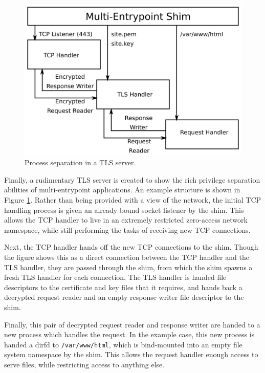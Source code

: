 \documentclass[sigplan]{acmart}
\begin{document}
\begin{figure}
    \centering
    \includegraphics[width=\columnwidth]{figures/tls-server-splitting.png}
    \caption{Process separation in a TLS server.}
    \label{fig:tls-server-splitting}
\end{figure}

Finally, a rudimentary TLS server is created to show the rich privilege separation abilities of multi-entrypoint applications. An example structure is shown in Figure \ref{fig:tls-server-splitting}. Rather than being provided with a view of the network, the initial TCP handling process is given an already bound socket listener by the shim. This allows the TCP handler to live in an extremely restricted zero-access network namespace, while still performing the tasks of receiving new TCP connections.

Next, the TCP handler hands off the new TCP connections to the shim. Though the figure shows this as a direct connection between the TCP handler and the TLS handler, they are passed through the shim, from which the shim spawns a fresh TLS handler for each connection. The TLS handler is handed file descriptors to the certificate and key files that it requires, and hands back a decrypted request reader and an empty response writer file descriptor to the shim.

Finally, this pair of decrypted request reader and response writer are handed to a new process which handles the request. In the example case, this new process is handed a dirfd to \texttt{/var/www/html}, which is bind-mounted into an empty file system namespace by the shim. This allows the request handler enough access to serve files, while restricting access to anything else.
\end{document}
